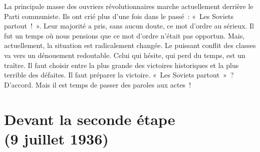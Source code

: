 \documentclass[french,twoside]{book} %
\begin{document}
La principale masse des ouvriers révolutionnaires marche actuellement derrière le Parti communiste. Ils ont crié plus d’une fois dans le passé : « Les Soviets partout ! ». Leur majorité a pris, sans aucun doute, ce mot d’ordre au sérieux. Il fut un temps où nous pensions que ce mot d’ordre n’était pas opportun. Mais, actuellement, la situation est radicalement changée. Le puissant conflit des classes va vers un dénouement redoutable. Celui qui hésite, qui perd du temps, est un traître. Il faut choisir entre la plus grande des victoires historiques et la plus terrible des défaites. Il faut préparer la victoire. « Les Soviets partout » ? D’accord. Mais il est temps de passer des paroles aux actes !
 \section[{Devant la seconde étape, (9 juillet 1936)}]{Devant la seconde étape \\
(9 juillet 1936)}
\label{p8}\renewcommand{\leftmark}{Devant la seconde étape \\
(9 juillet 1936)}
\end{document}
